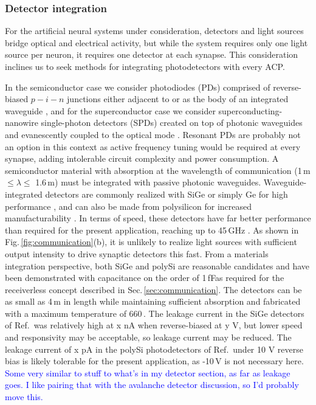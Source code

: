 \documentclass[twocolumn]{article}
\begin{document}
\subsubsection{Detector integration}
For the artificial neural systems under consideration, detectors and light sources bridge optical and electrical activity, but while the system requires only one light source per neuron, it requires one detector at each synapse. This consideration inclines us to seek methods for integrating photodetectors with every ACP.

In the semiconductor case we consider photodiodes (PDs) comprised of reverse-biased $p-i-n$ junctions either adjacent to or as the body of an integrated waveguide \cite{orma2012,derose2011ultra,meor2014}, and for the superconductor case we consider superconducting-nanowire single-photon detectors (SPDs) created on top of photonic waveguides and evanescently coupled to the optical mode \cite{spga2011,pesc2012,feka2015,saga2015,shbu2017b,buta2020}. Resonant PDs are probably not an option in this context as active frequency tuning would be required at every synapse, adding intolerable circuit complexity and power consumption. A semiconductor material with absorption at the wavelength of communication (1\,\textmu m $\le \lambda \le$ 1.6\,\textmu m) must be integrated with passive photonic waveguides. Waveguide-integrated detectors are commonly realized with SiGe or simply Ge for high performance \cite{derose2011ultra}, and can also be made from polysilicon for increased manufacturability \cite{meor2014}. In terms of speed, these detectors have far better performance than required for the present application, reaching up to 45\,GHz \cite{derose2011ultra}. As shown in Fig.\,\ref{fig:communication}(b), it is unlikely to realize light sources with sufficient output intensity to drive synaptic detectors this fast. From a materials integration perspective, both SiGe and polySi are reasonable candidates and have been demonstrated with capacitance on the order of 1\,fF\textemdash as required for the receiverless concept described in Sec.\,\ref{sec:communication}. The detectors can be as small as 4\,\textmu m in length while maintaining sufficient absorption and fabricated with a maximum temperature of 660\,\textcelsius \cite{derose2011ultra}. The leakage current in the SiGe detectors of Ref.\,\cite{} was relatively high at x nA when reverse-biased at y V, but lower speed and responsivity may be acceptable, so leakage current may be reduced. The leakage current of x pA in the polySi photodetectors of Ref.\,\cite{derose2011ultra} under 10 V reverse bias is likely tolerable for the present application, as -10\,V is not necessary here. \textcolor{blue}{Some very similar to stuff to what's in my detector section, as far as leakage goes. I like pairing that with the avalanche detector discussion, so I'd probably move this.}
\end{document}
